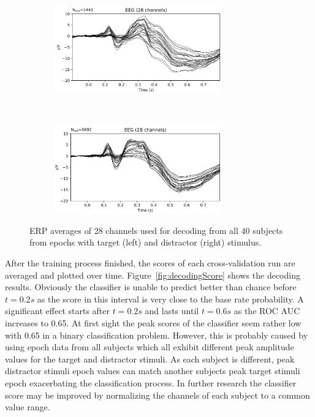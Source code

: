 \documentclass[a4paper]{article}
\begin{document}
\begin{figure}[tbh!] 
\centering
 \begin{subfigure}[t]{0.5\textwidth}
        \centering
        \includegraphics[height=1.5in]{decodingTarget.png}
\end{subfigure}%
    ~ 
\begin{subfigure}[t]{0.5\textwidth}
        \centering
        \includegraphics[height=1.5in]{decodingDistractor.png}
\end{subfigure}
	\caption{ERP averages of 28 channels used for decoding from all 40 subjects from epochs with target (left) and distractor (right) stimulus.}
     \label{fig:decodeComp}
\end{figure}

After the training process finished, the scores of each cross-validation run are averaged and plotted over time.
Figure~\ref{fig:decodingScore} shows the decoding results.
Obviously the classifier is unable to predict better than chance before $t=0.2s$ as the score in this interval is very close to the base rate probability.
A significant effect starts after $t=0.2s$ and lasts until $t=0.6s$ as the ROC AUC increases to 0.65.
At first sight the peak scores of the classifier seem rather low with 0.65 in a binary classification problem.
However, this is probably caused by using epoch data from all subjects which all exhibit different peak amplitude values for the target and distractor stimuli.
As each subject is different, peak distractor stimuli epoch values can match another subjects peak target stimuli epoch exacerbating the classification process.
In further research the classifier score may be improved by normalizing the channels of each subject to a common value range.
\end{document}
